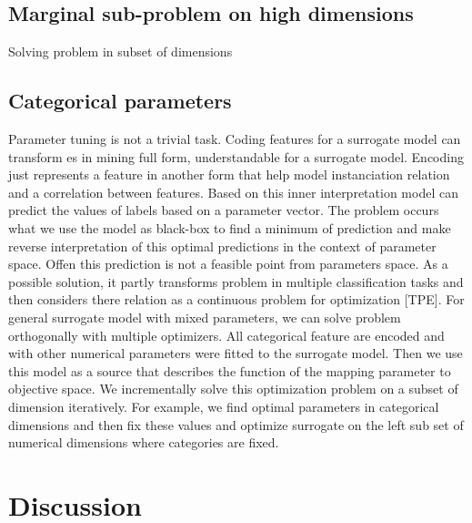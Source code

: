         \subsection{Marginal sub-problem on high dimensions}
        Solving problem in subset of dimensions

        \subsection{Categorical parameters}
        Parameter tuning is not a trivial task. Coding features for a surrogate model can transform es in mining full form, understandable for a surrogate model. Encoding just represents a feature in another form that help model instanciation relation and a correlation between features. Based on this inner interpretation model can predict the values of labels based on a parameter vector. The problem occurs what we use the model as black-box to find a minimum of prediction and make reverse interpretation of this optimal predictions in the context of parameter space. Offen this prediction is not a feasible point from parameters space. As a possible solution, it partly transforms problem in multiple classification tasks and then considers there relation as a continuous problem for optimization [TPE]. For general surrogate model with mixed parameters, we can solve problem orthogonally with multiple optimizers. All categorical feature are encoded and with other numerical parameters were fitted to the surrogate model. Then we use this model as a source that describes the function of the mapping parameter to objective space.  We incrementally solve this optimization problem on a subset of dimension iteratively. For example, we find optimal parameters in categorical dimensions and then fix these values and optimize surrogate on the left sub set of numerical dimensions where categories are fixed.












    \section{Discussion}

